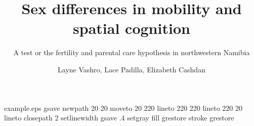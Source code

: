 %
%
%
%
%
\begin{filecontents*}{example.eps}
gsave
newpath
  20 20 moveto
  20 220 lineto
  220 220 lineto
  220 20 lineto
closepath
2 setlinewidth
gsave
  .4 setgray fill
grestore
stroke
grestore
\end{filecontents*}
%
\RequirePackage{fix-cm}
%
\documentclass[smallextended]{svjour3}       %
%
\smartqed  %
%
\usepackage{graphicx}
\usepackage{natbib}

%
%
%
%
%


\title{Sex differences in mobility and spatial cognition%
}
\subtitle{A test or the fertility and parental care hypothesis in northwestern Namibia}


\author{Layne Vashro, Lace Padilla, Elizabeth Cashdan
}


